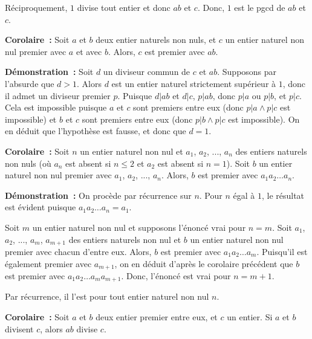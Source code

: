 Réciproquement, $1$ divise tout entier et donc $ab$ et $c$.
Donc, $1$ est le pgcd de $ab$ et $c$.

\done

\medskip 

\noindent\textbf{Corolaire :} Soit $a$ et $b$ deux entier naturels non nuls, et $c$ un entier naturel non nul premier avec $a$ et avec $b$. 
Alors, $c$ est premier avec $ab$.

\medskip

\noindent\textbf{Démonstration :}
    Soit $d$ un diviseur commun de $c$ et $a b$. 
    Supposons par l'absurde que $d > 1$.
    Alors $d$ est un entier naturel strictement supérieur à $1$, donc il admet un diviseur premier $p$. 
    Puisque $d \vert ab$ et $d \vert c$, $p \vert ab$, donc $p \vert a$ ou $p \vert b$, et $p \vert c$. 
    Cela est impossible puisque $a$ et $c$ sont premiers entre eux (donc $p \vert a \wedge p \vert c$ est impossible) et $b$ et $c$ sont premiers entre eux (donc $p \vert b \wedge p \vert c$ est impossible). 
    On en déduit que l'hypothèse est fausse, et donc que $d=1$.
    
    \done

\medskip 

\noindent\textbf{Corolaire :} Soit $n$ un entier naturel non nul et $a_1$, $a_2$, ..., $a_n$ des entiers naturels non nuls (où $a_n$ est absent si $n \leq 2$ et $a_2$ est absent si $n = 1$). 
    Soit $b$ un entier naturel non nul premier avec $a_1$, $a_2$, ..., $a_n$.
    Alors, $b$ est premier avec $a_1 a_2 \dots a_n$.

\medskip

\noindent\textbf{Démonstration :}
    On procède par récurrence sur $n$. 
    Pour $n$ égal à $1$, le résultat est évident puisque $a_1 a_2 \dots a_n = a_1$.

    Soit $m$ un entier naturel non nul et supposons l'énoncé vrai pour $n = m$.
    Soit $a_1$, $a_2$, ..., $a_m$, $a_{m+1}$ des entiers naturels non nul et $b$ un entier naturel non nul premier avec chacun d'entre eux.
    Alors, $b$ est premier avec $a_1 a_2 \dots a_m$. 
    Puisqu'il est également premier avec $a_{m+1}$, on en déduit d'après le corolaire précédent que $b$ est premier avec $a_1 a_2 \dots a_m a_{m+1}$.
    Donc, l'énoncé est vrai pour $n = m+1$. 
    
    Par récurrence, il l'est pour tout entier naturel non nul $n$.

    \done

\medskip 

\noindent\textbf{Corolaire :} Soit $a$ et $b$ deux entier premier entre eux, et $c$ un entier. Si $a$ et $b$ divisent $c$, alors $ab$ divise $c$.

